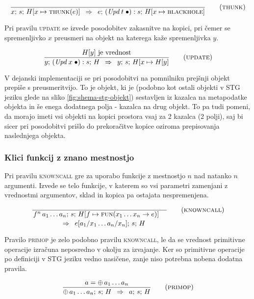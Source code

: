 \begin{equation}	
\infer[thunk]{}{
	x; \, s; \, H[x \mapsto \textsc{thunk}(e)]
}{
	e; \, (\textit{Upd} \; t \; \bullet) : s; \, H[x \mapsto \textsc{blackhole}]
}
\end{equation}

Pri pravilu \textsc{update} se izvede posodobitev zakasnitve na kopici, pri čemer se spremenljivko $x$ preusmeri na objekt na katerega kaže spremenljivka $y$.

\begin{equation}
\infer[update]{
	\text{$H[y]$ je vrednost}
}{
	y; \, (\textit{Upd} \; x \; \bullet) : s; \, H
}{
	y; \, s; \, H[x \mapsto H[y]
}
\end{equation}

V dejanski implementaciji se pri posodobitvi na pomnilniku prejšnji ob\-je\-kt prepiše s preusmeritvijo. To je objekt, ki je (podobno kot ostali objekti v STG jeziku glede na sliko \ref{fig:shema-stg-objekt}) sestavljen iz kazalca na metapodatke objekta in še enega dodatnega polja - kazalca na drug objekt. To pa tudi pomeni, da morajo imeti vsi objekti na kopici prostora vsaj za 2 kazalca (2 polji), saj bi sicer pri posodobitvi prišlo do prekoračitve kopice oziroma prepisovanja naslednjega objekta.

\subsubsection{Klici funkcij z znano mestnostjo}

Pri pravilu \textsc{knowncall} gre za uporabo funkcije z mestnostjo $n$ nad natanko $n$ argumenti. Izvede se telo funkcije, v katerem so vsi parametri zamenjani z vrednostmi argumentov, sklad in kopica pa ostajata nespremenjena.

\begin{equation}
	\linfer[knowncall]{}{
		f^n \, a_1 \dots a_n; \, s; \, H[f \mapsto \textsc{fun}(x_1 \dots x_n \to e)]
	}{
		e[a_1 / x_1 \dots a_n / x_n]; \, s; \, H
	}
\end{equation}

Pravilo \textsc{primop} je zelo podobno pravilu \textsc{knowncall}, le da se vrednost primitivne operacije izračuna neposredno v okolju za izvajanje. Ker so primitivne operacije po definiciji v STG jeziku vedno nasičene, zanje niso potrebna nobena dodatna pravila.

\begin{equation}
	\infer[primop]{
		a = \oplus \, a_1 \dots a_n
	}{
		\oplus \, a_1 \dots a_n; \, s; \, H
	}{
		a; \, s; \, H
	}
\end{equation}

